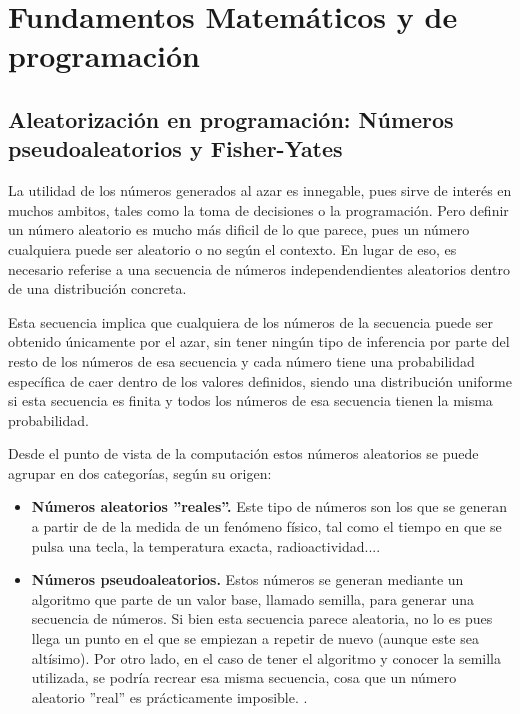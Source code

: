 \chapter{Fundamentos Matemáticos y  de programación}

\section{Aleatorización en programación: Números pseudoaleatorios y Fisher-Yates}

La utilidad de los números generados al azar es innegable, pues sirve de interés en muchos ambitos, tales como la toma de decisiones o la programación. Pero definir un número aleatorio es mucho más dificil de lo que parece,  pues un número cualquiera puede ser aleatorio o no según el contexto. En lugar de eso, es necesario referise a una secuencia de números independendientes aleatorios dentro de una distribución concreta.

Esta secuencia implica que cualquiera de los números de la secuencia puede ser obtenido únicamente por el azar, sin tener ningún tipo de inferencia por parte del resto de los números de esa secuencia y cada número tiene una probabilidad específica de caer dentro de los valores definidos, siendo una distribución uniforme si esta secuencia es finita y todos los números de esa secuencia tienen la misma probabilidad.\cite{knuth} 

Desde el punto de vista de la computación estos números aleatorios se puede agrupar en dos categorías, según su origen:

\begin{itemize}
\item \textbf{Números aleatorios ''reales''.} Este tipo de números son los que se generan a partir de  de la medida de un fenómeno físico, tal como el tiempo en que se pulsa una tecla, la temperatura exacta, radioactividad....

\item \textbf{Números pseudoaleatorios.} Estos números se generan mediante un algoritmo que parte de un valor base, llamado semilla, para generar una secuencia de números. Si bien esta secuencia parece aleatoria, no lo es pues llega un punto en el que se empiezan a repetir de nuevo (aunque este sea altísimo). Por otro lado, en el caso de tener el algoritmo y conocer la semilla utilizada, se podría recrear esa misma secuencia, cosa que un número aleatorio ''real'' es prácticamente imposible. \cite{pnrg}.
\end{itemize}

